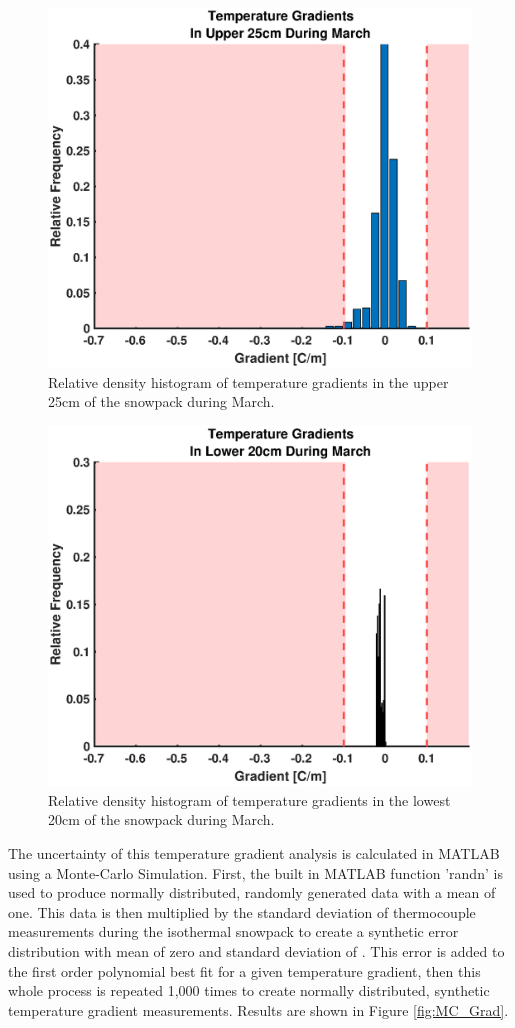    \begin{figure}[H]
    \centering
    \includegraphics[width=0.7\linewidth]{figures/TempGrad/Mar_U25_RDH.eps}
    \caption{Relative density histogram of temperature gradients in the upper 25cm of the snowpack during March.}
    \label{fig:Mar_U25_RDH}
 \end{figure}
 
   \begin{figure}[H]
    \centering
    \includegraphics[width=0.7\linewidth]{figures/TempGrad/Mar_L20_RDH.eps}
    \caption{Relative density histogram of temperature gradients in the lowest 20cm of the snowpack during March.}
    \label{fig:Mar_L20_RDH}
 \end{figure}
 
The uncertainty of this temperature gradient analysis is calculated in MATLAB using a Monte-Carlo Simulation. First, the built in MATLAB function 'randn' is used to produce normally distributed, randomly generated data with a mean of one. This data is then multiplied by the standard deviation of thermocouple measurements during the isothermal snowpack to create a synthetic error distribution with mean of zero and standard deviation of \isostd. This error is added to the first order polynomial best fit for a given temperature gradient, then this whole process is repeated 1,000 times to create normally distributed, synthetic temperature gradient measurements. Results are shown in Figure \ref{fig:MC_Grad}.


